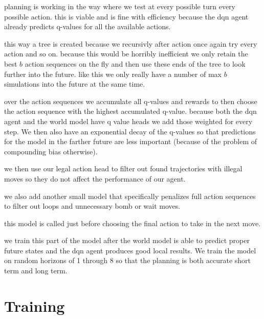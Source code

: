 \documentclass[article, 10pt]{IEEEtran}
\begin{document}
planning is working in the way where we test at every possible turn every possible action. this is viable and is fine with efficiency because the dqn agent already predicts q-values for all the available actions. 

this way a tree is created because we recursivly after action once again try every action and so on. because this would be horribly inefficient we only retain the best $b$ action sequences on the fly and then use these ends of the tree to look further into the future. like this we only really have a number of max $b$ simulations into the future at the same time. 

over the action sequences we accumulate all q-values and rewards to then choose the action sequence with the highest accumulated q-value. because both the dqn agent and the world model have q value heads we add those weighted for every step. We then also have an exponential decay of the q-values so that predictions for the model in the farther future are less important (because of the problem of compounding bias otherwise).

we then use our legal action head to filter out found trajectories with illegal moves so they do not affect the performance of our agent.

we also add another small model that specifically penalizes full action sequences to filter out loops and unnecessary bomb or wait moves. 

this model is called just before choosing the final action to take in the next move.


we train this part of the model after the world model is able to predict proper future states and the dqn agent produces good local results. We train the model on random horizons of 1 through 8 so that the planning is both accurate short term and long term.





\section{Training}\label{sec:5_training}
\end{document}
